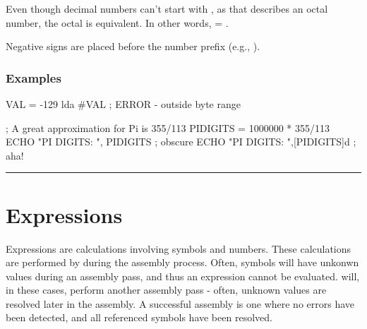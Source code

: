 Even though decimal numbers can't start with , as that describes an octal number, the octal  is equivalent. In other words,  = .

Negative signs are placed before the number prefix (e.g., ).

\subsubsection{Examples}


\begin{code}
VAL = -129
 lda #VAL           ; ERROR - outside byte range
\end{code}



\begin{code}
; A great approximation for Pi is 355/113
PIDIGITS = 1000000 * 355/113
  ECHO "PI DIGITS: ", PIDIGITS    ; obscure
  ECHO "PI DIGITS: ",[PIDIGITS]d  ; aha!
\end{code}





\hrule
{}


\section{Expressions}

Expressions are calculations involving symbols and numbers. These calculations are performed by \dasm during the assembly process. Often, symbols will have unkonwn values during an assembly pass, and thus an expression cannot be evaluated. \dasm will, in these cases, perform another assembly pass - often, unknown values are resolved later in the assembly.  A successful assembly is one where no errors have been detected, and all referenced symbols have been resolved.

